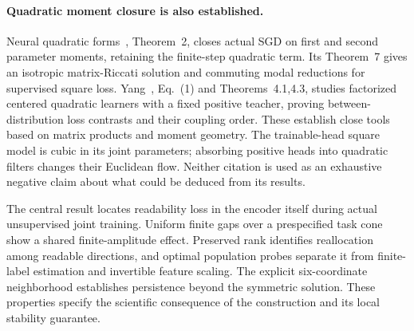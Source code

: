 \paragraph{Quadratic moment closure is also established.}
Neural quadratic forms~\cite{liu2026nqf}, Theorem~2, closes actual SGD on first and second parameter moments, retaining the finite-step quadratic term. Its Theorem~7 gives an isotropic matrix-Riccati solution and commuting modal reductions for supervised square loss. Yang~\cite{yang2026spectral}, Eq.~(1) and Theorems~4.1,4.3, studies factorized centered quadratic learners with a fixed positive teacher, proving between-distribution loss contrasts and their coupling order. These establish close tools based on matrix products and moment geometry. The trainable-head square model is cubic in its joint parameters; absorbing positive heads into quadratic filters changes their Euclidean flow. Neither citation is used as an exhaustive negative claim about what could be deduced from its results.

The central result locates readability loss in the encoder itself during actual unsupervised joint training. Uniform finite gaps over a prespecified task cone show a shared finite-amplitude effect. Preserved rank identifies reallocation among readable directions, and optimal population probes separate it from finite-label estimation and invertible feature scaling. The explicit six-coordinate neighborhood establishes persistence beyond the symmetric solution. These properties specify the scientific consequence of the construction and its local stability guarantee.
